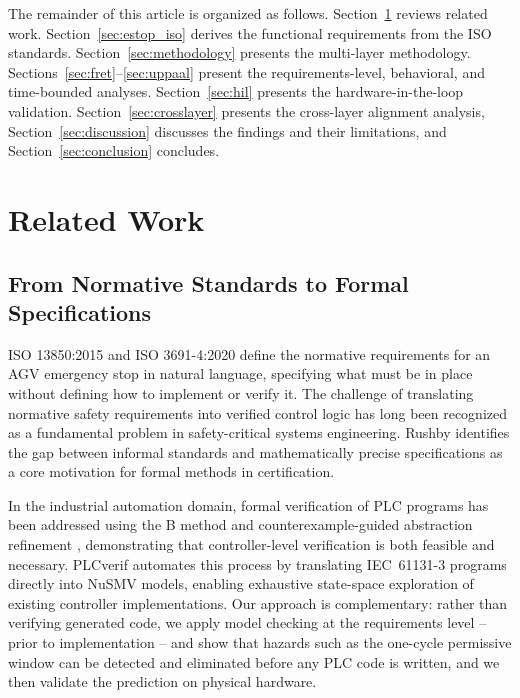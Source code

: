 \documentclass{ieeeaccess}
\theoremstyle{definition}
\begin{document}
The remainder of this article is organized as follows. Section~\ref{sec:related} reviews related work. Section~\ref{sec:estop_iso} derives the functional requirements from the ISO standards. Section~\ref{sec:methodology} presents the multi-layer methodology. Sections~\ref{sec:fret}--\ref{sec:uppaal} present the requirements-level, behavioral, and time-bounded analyses. Section~\ref{sec:hil} presents the hardware-in-the-loop validation. Section~\ref{sec:crosslayer} presents the cross-layer alignment analysis, Section~\ref{sec:discussion} discusses the findings and their limitations, and Section~\ref{sec:conclusion} concludes.

\section{Related Work}
\label{sec:related}

\subsection{From Normative Standards to Formal Specifications}
ISO 13850:2015 \cite{ISO13850} and ISO 3691-4:2020 \cite{ISO3691-4} define the normative requirements for an AGV emergency stop in natural language, specifying what must be in place without defining how to implement or verify it. The challenge of translating normative safety requirements into verified control logic has long been recognized as a fundamental problem in safety-critical systems engineering. Rushby \cite{Rushby} identifies the gap between informal standards and mathematically precise specifications as a core motivation for formal methods in certification.

In the industrial automation domain, formal verification of PLC programs has been addressed using the B method \cite{Darvas} and counterexample-guided abstraction refinement \cite{Biallas}, demonstrating that controller-level verification is both feasible and necessary. PLCverif \cite{PLCverify} automates this process by translating IEC~61131-3 programs directly into NuSMV models, enabling exhaustive state-space exploration of existing controller implementations. Our approach is complementary: rather than verifying generated code, we apply model checking at the requirements level -- prior to implementation -- and show that hazards such as the one-cycle permissive window can be detected and eliminated before any PLC code is written, and we then validate the prediction on physical hardware.
\end{document}
